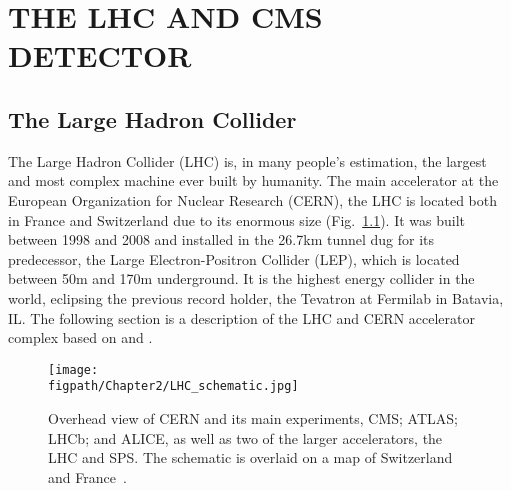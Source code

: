 %
%
%



\chapter{\uppercase {The LHC and CMS Detector}}
\label{ch:LHC_CMS}

\section{The Large Hadron Collider}
\label{sec:LHC}

The Large Hadron Collider (LHC) \cite{Breskin:1244506} is, in many people's estimation, the largest and most complex machine ever built by humanity.
The main accelerator at the European Organization for Nuclear Research (CERN), the LHC is located both in France and Switzerland due to its enormous size (Fig.~\ref{fig:LHC_schematic}).
It was built between 1998 and 2008 and installed in the 26.7\unit{km} tunnel dug for its predecessor, the Large Electron-Positron Collider (LEP), which is located between 50\unit{m} and 170\unit{m} underground.
It is the highest energy collider in the world, eclipsing the previous record holder, the Tevatron at Fermilab in Batavia, IL.
The following section is a description of the LHC and CERN accelerator complex based on \cite{LHCmachine} and \cite{Breskin:1244506}.

\begin{figure}[!hbt]
    \vspace*{-0.5cm}
    \centering
    \texttt{[image: \\figpath/Chapter2/LHC\_schematic.jpg]}
    \caption{Overhead view of CERN and its main experiments, CMS; ATLAS; LHCb; and ALICE, as well as two of the larger accelerators, the LHC and SPS. The schematic is overlaid on a map of Switzerland and France~\cite{LHC-schematic}.}
    \label{fig:LHC_schematic}
\end{figure}

